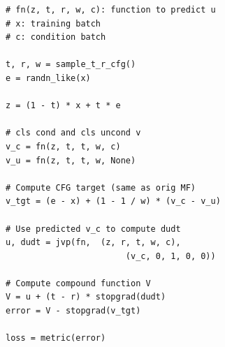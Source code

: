 



\begin{algorithm}[t]
\centering
\caption{{improved MeanFlow}: training guidance.\\
{\scriptsize Note: in PyTorch and JAX, \texttt{jvp} returns the function output and JVP.}}

\begin{minipage}{0.99\linewidth}
\begin{lstlisting}[language=PythonFuncColor, escapechar=`]
# fn(z, t, r, w, c): function to predict u
# x: training batch
# c: condition batch

t, r, w = sample_t_r_cfg()
e = randn_like(x)

z = (1 - t) * x + t * e

# cls cond and cls uncond v
v_c = fn(z, t, t, w, c)
v_u = fn(z, t, t, w, None)

# Compute CFG target (same as orig MF)
v_tgt = (e - x) + (1 - 1 / w) * (v_c - v_u)

# Use predicted v_c to compute dudt
u, dudt = jvp(fn,  (z, r, t, w, c),  
                        (v_c, 0, 1, 0, 0))

# Compute compound function V
V = u + (t - r) * stopgrad(dudt)
error = V - stopgrad(v_tgt)

loss = metric(error)
\end{lstlisting}
\end{minipage}
\label{alg:cfg_code}
\end{algorithm}